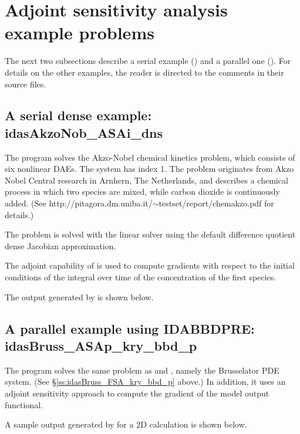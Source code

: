 \section{Adjoint sensitivity analysis example problems}\label{s:adj_examples}

The next two subsections describe a serial example () and
a parallel one ().
For details on the other examples, the reader is directed to the comments in their
source files.

\subsection{A serial dense example: idasAkzoNob\_ASAi\_dns}\label{ss:idasAkzoNob_ASAi_dns}

The  program solves the Akzo-Nobel chemical kinetics problem,
which consists of six nonlinear DAEs.  The system has index 1. 
The problem originates from Akzo Nobel Central research in Arnhern,
The Netherlands, and describes a chemical process in which two
species are mixed, while carbon dioxide is continuously added.
(See http://pitagora.dm.uniba.it/$\sim$testset/report/chemakzo.pdf for
details.)

The problem is solved with the {\idadense} linear solver using the
default difference quotient dense Jacobian approximation.

The adjoint capability of {\idas} is used to compute gradients with
respect to the initial conditions of the integral over time of the 
concentration of the first species.

The output generated by  is shown below.




\subsection{A parallel example using IDABBDPRE: idasBruss\_ASAp\_kry\_bbd\_p}
\label{ss:idasBruss_ASAp_kry_bbd_p}

The  program solves the same problem as
 and , namely the
Brusselator PDE system.  (See \S\ref{ss:idasBruss_FSA_kry_bbd_p} above.)
In addition, it uses an adjoint sensitivity approach to compute the
gradient of the model output functional.

A sample output generated by  for a
2D calculation is shown below.



